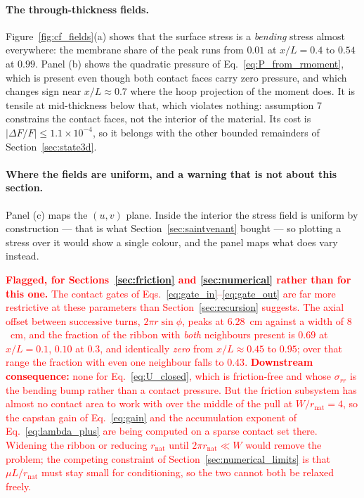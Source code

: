 \documentclass[11pt]{article}
\begin{document}
\paragraph{The through-thickness fields.} Figure~\ref{fig:cf_fields}(a) shows
that the surface stress is a \emph{bending} stress almost everywhere: the
membrane share of the peak runs from $0.01$ at $x/L = 0.4$ to $0.54$ at $0.99$.
Panel (b) shows the quadratic pressure of Eq.~\eqref{eq:P_from_rmoment}, which is
present even though both contact faces carry zero pressure, and which changes
sign near $x/L \approx 0.7$ where the hoop projection of the moment does. It is
tensile at mid-thickness below that, which violates nothing: assumption 7
constrains the contact faces, not the interior of the material. Its cost is
$\left|\Delta F/F\right| \le 1.1\times10^{-4}$, so it belongs with the other
bounded remainders of Section~\ref{sec:state3d}.

\paragraph{Where the fields are uniform, and a warning that is not about this
section.} Panel (c) maps the $\left(u,v\right)$ plane. Inside the interior the
stress field is uniform by construction --- that is what
Section~\ref{sec:saintvenant} bought --- so plotting a stress over it would show
a single colour, and the panel maps what does vary instead.

\medskip
\noindent\textcolor{red}{\textbf{Flagged, for Sections~\ref{sec:friction}
and \ref{sec:numerical} rather than for this one.} The contact gates of
Eqs.~\eqref{eq:gate_in}--\eqref{eq:gate_out} are far more restrictive at these
parameters than Section~\ref{sec:recursion} suggests. The axial offset between
successive turns, $2\pi r\sin\phi$, peaks at $6.28$~cm against a width of
$8$~cm, and the fraction of the ribbon with \emph{both} neighbours present is
$0.69$ at $x/L = 0.1$, $0.10$ at $0.3$, and identically \emph{zero} from
$x/L \approx 0.45$ to $0.95$; over that range the fraction with even one
neighbour falls to $0.43$. \textbf{Downstream consequence:} none for
Eq.~\eqref{eq:U_closed}, which is friction-free and whose $\sigma_{rr}$ is the
bending bump rather than a contact pressure. But the friction subsystem has
almost no contact area to work with over the middle of the pull at
$W/r_{\mathrm{nat}} = 4$, so the capstan gain of Eq.~\eqref{eq:gain} and the
accumulation exponent of Eq.~\eqref{eq:lambda_plus} are being computed on a
sparse contact set there. Widening the ribbon or reducing $r_{\mathrm{nat}}$
until $2\pi r_{\mathrm{nat}} \ll W$ would remove the problem; the competing
constraint of Section~\ref{sec:numerical_limits} is that $\mu L/r_{\mathrm{nat}}$
must stay small for conditioning, so the two cannot both be relaxed
freely.}
\medskip
\end{document}
